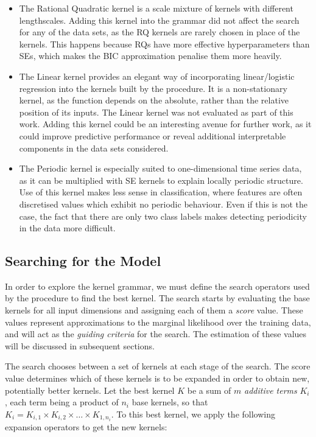 \documentclass[a4paper,12pt ]{report}
\newcommand{\kerntimes}{ \! \times \!}
\begin{document}
\begin{itemize}

\item The Rational Quadratic kernel is a scale mixture of {\SE} kernels with different lengthscales. Adding this kernel into the grammar did not affect the search for any of the data sets, as the RQ kernels are rarely chosen in place of the {\SE} kernels. This happens because RQs have more effective hyperparameters than SEs, which makes the BIC approximation penalise them more heavily.

\item The Linear kernel provides an elegant way of incorporating linear/logistic regression into the kernels built by the procedure. It is a non-stationary kernel, as the function depends on the absolute, rather than the relative position of its inputs. The Linear kernel was not evaluated as part of this work. Adding this kernel could be an interesting avenue for further work, as it could improve predictive performance or reveal additional interpretable components in the data sets considered.

\item The Periodic kernel is especially suited to one-dimensional time series data, as it can be multiplied with SE kernels to explain locally periodic structure. Use of this kernel makes less sense in classification, where features are often discretised values which exhibit no periodic behaviour. Even if this is not the case, the fact that there are only two class labels makes detecting periodicity in the data more difficult.

\end{itemize}

\subsection{Searching for the Model}

In order to explore the kernel grammar, we must define the search operators used by the procedure to find the best kernel. The search starts by evaluating the base {\SE} kernels for all input dimensions and assigning each of them a \emph{score} value. These values represent approximations to the marginal likelihood over the training data, and will act as the \emph{guiding criteria} for the search. The estimation of these values will be discussed in subsequent sections.

The search chooses between a set of kernels at each stage of the search. The score value determines which of these kernels is to be expanded in order to obtain new, potentially better kernels. Let the best kernel $K$ be a sum of $m$ \emph{additive terms} $K_i$, each term being a product of $n_i$ base kernels, so that $K_i = K_{i, 1} \kerntimes K_{i, 2} \kerntimes \ldots \kerntimes K_{1, n_i}$. To this best kernel, we apply the following expansion operators to get the new kernels:
\end{document}

